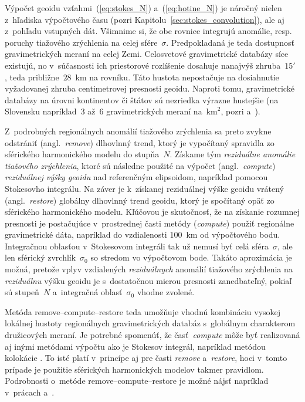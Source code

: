 \documentclass[a4paper, 12pt]{book}
\begin{document}
Výpočet geoidu vzťahmi~(\ref{eq:stokes_N}) a~(\ref{eq:hotine_N}) je náročný 
nielen z~hľadiska výpočtového času (pozri 
Kapitolu~\ref{sec:stokes_convolution}), ale aj z~pohľadu vstupných dát.  
Všimnime si, že obe rovnice integrujú anomálie, resp. poruchy tiažového 
zrýchlenia na celej sfére~$\sigma$.  Predpokladaná je teda dostupnosť 
gravimetrických meraní na celej Zemi.  Celosvetové gravimetrické databázy síce 
existujú, no v~súčasnosti ich priestorové rozlíšenie dosahuje nanajvýš 
zhruba~$15'$ \parencite{EGM2008,Pail2018}, teda približne~$28$~km na rovníku.  
Táto hustota nepostačuje na dosiahnutie vyžadovanej zhruba centimetrovej 
presnosti geoidu.  Naproti tomu, gravimetrické databázy na úrovni kontinentov 
či štátov sú nezriedka výrazne hustejšie (na Slovensku napríklad~3 až~6 
gravimetrických meraní na~$\textrm{km}^2$, pozri \cite{Kubes2001} 
a~\cite{Zahorec2017}).

Z~podrobných regionálnych anomálií tiažového zrýchlenia sa preto zvykne 
odstrániť (angl.~\emph{remove}) dlhovlnný trend, ktorý je vypočítaný spravidla 
zo sférického harmonického modelu do stupňa~$N$.  Získame tým \emph{reziduálne 
anomálie tiažového zrýchlenia}, ktoré sú následne použité na výpočet 
(angl.~\emph{compute}) \emph{reziduálnej výšky geoidu} nad referenčným 
elipsoidom, napríklad pomocou Stokesovho integrálu.  Na záver je k~získanej 
reziduálnej výške geoidu vrátený (angl.~\emph{restore}) globálny dlhovlnný 
trend geoidu, ktorý je spočítaný opäť zo sférického harmonického modelu.  
Kľúčovou je skutočnosť, že na získanie rozumnej presnosti je postačujúce 
v~prostrednej časti metódy (\emph{compute}) použiť regionálne gravimetrické 
dáta, napríklad do vzdialenosti 100~km od výpočtového bodu.  Integračnou 
oblasťou v~Stokesovom integráli tak už nemusí byť celá sféra~$\sigma$, ale len 
sférický zvrchlík~$\sigma_0$ so stredom vo výpočtovom bode.  Takáto aproximácia 
je možná, pretože vplyv vzdialených \emph{reziduálnych} anomálií tiažového 
zrýchlenia na \emph{reziduálnu} výšku geoidu je s~dostatočnou mierou presnosti 
zanedbateľný, pokiaľ sú stupeň~$N$ a~integračná oblasť~$\sigma_0$ vhodne 
zvolené.

Metóda remove--compute--restore teda umožňuje vhodnú kombináciu vysokej 
lokálnej hustoty regionálnych gravimetrických databáz s~globálnym charakterom 
družicových meraní.  Je potrebné spomenúť, že časť~\emph{compute} môže byť 
realizovaná aj inými metódami výpočtu ako je Stokesov integrál, napríklad 
metódou kolokácie \parencite{MoritzAdvancedGeodesy,MoritzPhysicalGeodesy}.  To 
isté platí v~princípe aj pre časti \emph{remove} a~\emph{restore}, hoci v~tomto 
prípade je použitie sférických harmonických modelov takmer pravidlom.  
Podrobnosti o~metóde remove--compute--restore je možné nájsť napríklad 
v~prácach \textcite{Sjoberg2005} a~\textcite{MoritzPhysicalGeodesy}.
\end{document}
